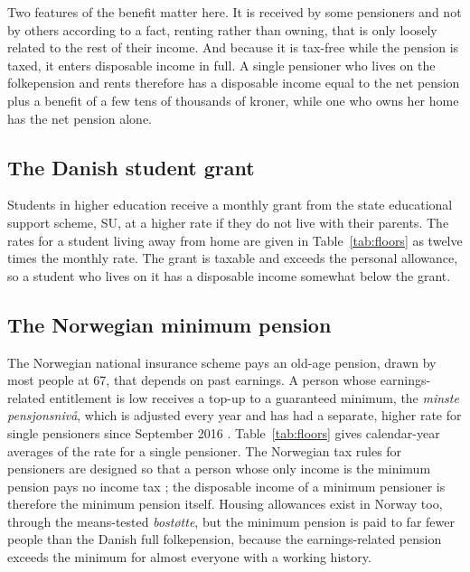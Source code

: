 Two features of the benefit matter here. It is received by some pensioners and not by others according to a fact, renting rather than owning, that is only loosely related to the rest of their income. And because it is tax-free while the pension is taxed, it enters disposable income in full. A single pensioner who lives on the folkepension and rents therefore has a disposable income equal to the net pension plus a benefit of a few tens of thousands of kroner, while one who owns her home has the net pension alone.

\subsection{The Danish student grant}

Students in higher education receive a monthly grant from the state educational support scheme, SU, at a higher rate if they do not live with their parents. The rates for a student living away from home are given in Table~\ref{tab:floors} as twelve times the monthly rate. The grant is taxable \citep{DKSkatSU} and exceeds the personal allowance, so a student who lives on it has a disposable income somewhat below the grant.

\subsection{The Norwegian minimum pension}

The Norwegian national insurance scheme pays an old-age pension, drawn by most people at 67, that depends on past earnings. A person whose earnings-related entitlement is low receives a top-up to a guaranteed minimum, the \emph{minste pensjonsnivå}, which is adjusted every year and has had a separate, higher rate for single pensioners since September 2016 \citep{NOMeld2016,NOMeld2020,NOMeld2022}. Table~\ref{tab:floors} gives calendar-year averages of the rate for a single pensioner. The Norwegian tax rules for pensioners are designed so that a person whose only income is the minimum pension pays no income tax \citep{NOSkatteetaten}; the disposable income of a minimum pensioner is therefore the minimum pension itself. Housing allowances exist in Norway too, through the means-tested \emph{bostøtte}, but the minimum pension is paid to far fewer people than the Danish full folkepension, because the earnings-related pension exceeds the minimum for almost everyone with a working history.


